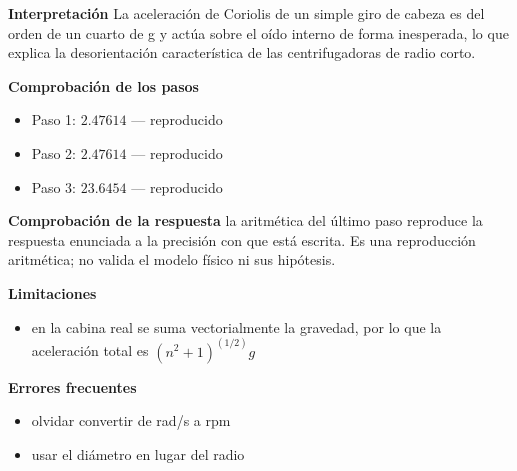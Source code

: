 \documentclass[10pt,openany]{book}
\begin{document}
\begin{tcolorbox}[title={Problema resuelto}, studiumworked, breakable]
\noindent\textbf{Interpretación}
La aceleración de Coriolis de un simple giro de cabeza es del orden de un cuarto de g y actúa sobre el oído interno de forma inesperada, lo que explica la desorientación característica de las centrifugadoras de radio corto.

\noindent\textbf{Comprobación de los pasos}
\begin{itemize}
\item Paso 1: $2.47614$ — reproducido
\item Paso 2: $2.47614$ — reproducido
\item Paso 3: $23.6454$ — reproducido
\end{itemize}

\noindent\textbf{Comprobación de la respuesta} la aritmética del último paso reproduce la respuesta enunciada a la precisión con que está escrita. Es una reproducción aritmética; no valida el modelo físico ni sus hipótesis.

\noindent\textbf{Limitaciones}
\begin{itemize}
\item en la cabina real se suma vectorialmente la gravedad, por lo que la aceleración total es \((n^2 + 1)^(1/2) g\)
\end{itemize}

\noindent\textbf{Errores frecuentes}
\begin{itemize}
\item olvidar convertir de rad/s a rpm
\item usar el diámetro en lugar del radio
\end{itemize}
\end{tcolorbox}
\end{document}
